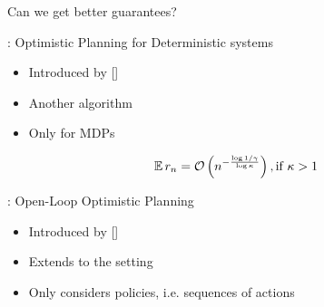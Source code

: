 \documentclass{beamer}
\begin{document}
\begin{frame}{Can we get better guarantees?}
    \begin{block}{\OPD: Optimistic Planning for Deterministic systems}
    \begin{itemize}
        \item Introduced by [\cite{Hren2008}]
        \item Another  algorithm
        \item Only for  MDPs
    \end{itemize}
    \end{block}
    \begin{theorem}
    \begin{equation*}
    \expectedvalue r_n = 
      \cO\left(n^{-\frac{\log 1/\gamma}{\log \kappa}}\right), \text{if}\ \kappa > 1 
    \end{equation*}
    \end{theorem}
    \pause
\begin{block}{\OLOP: Open-Loop Optimistic Planning}
    \begin{itemize}
        \item Introduced by [\cite{Bubeck2010}]
        \item Extends \OPD to the  setting
        \item Only considers  policies, i.e. sequences of actions
    \end{itemize}
    \end{block}
\end{frame}

    
\end{document}
